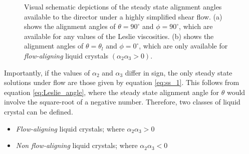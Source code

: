 \begin{figure}
\begin{center}
\hspace{0.7in}
\end{center}
\caption[Steady state alignment angles of a nematic liquid crystal]{\label{fig:ss} Visual schematic depictions of the steady state alignment angles available to the director under a highly simplified shear flow. (a) shows the alignment angles of $\theta=90^{\circ}$ and $\phi=90^{\circ}$, which are available for any values of the Leslie viscosities. (b) shows the alignment angles of $\theta=\theta_l$ and $\phi=0^{\circ}$, which are only available for \textit{flow-aligning} liquid crystals $\left(\alpha_2\alpha_3>0\right)$.}
\end{figure}

Importantly, if the values of $\alpha_2$ and $\alpha_3$ differ in sign, the only steady state solutions under flow are those given by equation \ref{eq:ss_1}. This follows from equation \ref{eq:Leslie_angle}, where the steady state alignment angle for $\theta$ would involve the square-root of a negative number. Therefore, two classes of liquid crystal can be defined.

\begin{itemize}
\item \textit{Flow-aligning} liquid crystals; where $\alpha_2\alpha_3>0$
\item \textit{Non flow-aligning} liquid crystals; where $\alpha_2\alpha_3<0$
\end{itemize}

